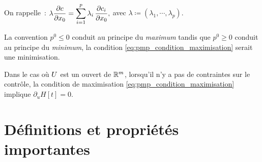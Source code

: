 \begin{myremark}
    On rappelle~:
    $\displaystyle \lambda \frac{{\rm \partial} c}{{\rm \partial} x_0} = \sum_{i=1}^{p} \lambda_i \, \frac{{\rm \partial} c_i}{{\rm \partial} x_0},$ avec $\lambda \coloneqq (\lambda_1, \cdots, \lambda_p)$.
\end{myremark}

\begin{myremark}
    La convention $p^0\le 0$ conduit au principe du \emph{maximum} tandis que $p^0 \ge 0$ conduit au principe du \emph{minimum}, \ie 
    la condition \eqref{eq:pmp_condition_maximisation} serait une minimisation.
\end{myremark}

\begin{myremark}
    Dans le cas o\`u $U$ est un ouvert de $\mathbb{R}^m$, \ie lorsqu'il n'y a pas de contraintes sur le contr\^ole, 
    la condition de maximisation \eqref{eq:pmp_condition_maximisation} implique $\partial_u H[t] = 0$.%
\end{myremark}

\section{D\'efinitions et propri\'et\'es importantes}

